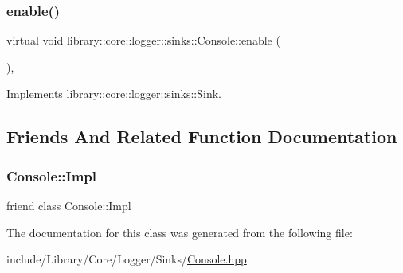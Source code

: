 \subsubsection{\texorpdfstring{enable()}{enable()}}
{\footnotesize\ttfamily virtual void library\+::core\+::logger\+::sinks\+::\+Console\+::enable (\begin{DoxyParamCaption}{ }\end{DoxyParamCaption})\hspace{0.3cm}{\ttfamily [override]}, {\ttfamily [virtual]}}



Implements \mbox{\hyperlink{classlibrary_1_1core_1_1logger_1_1sinks_1_1_sink_aa41e2b1488d2e761ded1d209eacf02b3}{library\+::core\+::logger\+::sinks\+::\+Sink}}.



\subsection{Friends And Related Function Documentation}
\mbox{\label{classlibrary_1_1core_1_1logger_1_1sinks_1_1_console_aeda242f6bb74cf8f4003eb67666e9118}} 
\subsubsection{\texorpdfstring{Console::Impl}{Console::Impl}}
{\footnotesize\ttfamily friend class Console\+::\+Impl\hspace{0.3cm}{\ttfamily [friend]}}



The documentation for this class was generated from the following file\+:\begin{DoxyCompactItemize}
\item 
include/\+Library/\+Core/\+Logger/\+Sinks/\mbox{\hyperlink{_console_8hpp}{Console.\+hpp}}\end{DoxyCompactItemize}
